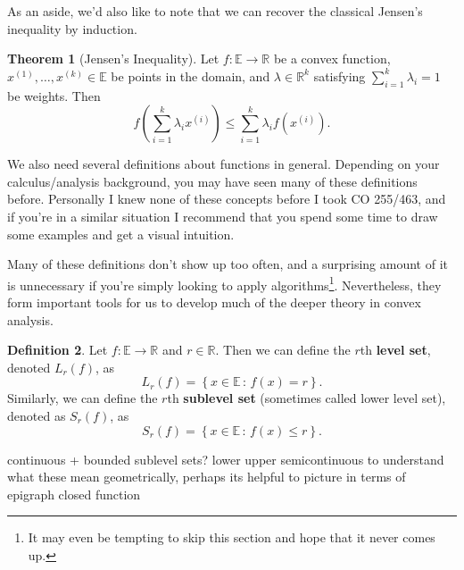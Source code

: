 \documentclass[11pt]{article}
\numberwithin{equation}{section}
\theoremstyle{definition}
\newtheorem{theorem}{Theorem}[section]
\newtheorem{definition}[theorem]{Definition}%
\newcommand{\bE}{\mathbb{E}}
\newcommand{\bR}{\mathbb{R}}
\newcommand{\set}[2]{\left\{#1\,:\,#2\right\}}
\begin{document}
As an aside, we'd also like to note that we can recover the classical Jensen's inequality by induction.
\begin{theorem}[Jensen's Inequality]
    Let $f:\bE\to\bR$ be a convex function, $x^{(1)},\dots, x^{(k)}\in\bE$ be points in the domain, and $\lambda\in\bR^k$ satisfying $\sum_{i=1}^k\lambda_i=1$ be weights. Then
    \begin{equation}
        f\left(\sum_{i=1}^k\lambda_ix^{(i)}\right)\le\sum_{i=1}^k\lambda_if(x^{(i)}).
    \end{equation}
\end{theorem}
We also need several definitions about functions in general. Depending on your calculus/analysis background, you may have seen many of these definitions before. Personally I knew none of these concepts before I took CO 255/463, and if you're in a similar situation I recommend that you spend some time to draw some examples and get a visual intuition.

Many of these definitions don't show up too often, and a surprising amount of it is unnecessary if you're simply looking to apply algorithms\footnote{It may even be tempting to skip this section and hope that it never comes up.}. Nevertheless, they form important tools for us to develop much of the deeper theory in convex analysis.
\begin{definition}
    Let $f:\bE\to\bR$ and $r\in\bR$. Then we can define the $r$th \textbf{level set}, denoted $L_r(f)$, as
    \begin{equation}
        L_r(f)=\set{x\in\bE}{f(x)=r}.
    \end{equation}
    Similarly, we can define the $r$th \textbf{sublevel set} (sometimes called lower level set), denoted as $S_r(f)$, as
    \begin{equation}
        S_r(f)=\set{x\in\bE}{f(x)\le r}.
    \end{equation}
\end{definition}
continuous + bounded sublevel sets?
lower upper semicontinuous
to understand what these mean geometrically, perhaps its helpful to picture in terms of epigraph
closed function
\end{document}
